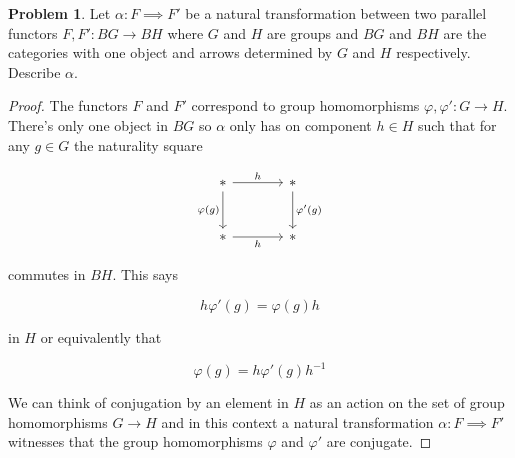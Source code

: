 \documentclass[11pt]{amsart}
\theoremstyle{plain}
\theoremstyle{definition}
\newtheorem{prob}{Problem}
\newcommand{\noi}{{\noindent}}
\begin{document}
\begin{prob}
Let $\alpha : F \implies F'$ be a natural transformation between two parallel functors $F , F' : BG \to BH$ where $G$ and $H$ are groups and $BG$ and $BH$ are the categories with one object and arrows determined by $G$ and $H$ respectively. Describe $\alpha$. 
\end{prob}
\begin{proof}
The functors $F$ and $F'$ correspond to group homomorphisms $\varphi, \varphi' : G \to H$. There's only one object in $BG$ so $\alpha$ only has on component $h \in H$ such that for any $g \in G$ the naturality square 

\[ \begin{tikzcd}[column sep = large, row sep = large]
* \dar["\varphi(g)"'] \rar["h"] & * \dar["\varphi'(g)"] \\
* \rar["h"'] & *
\end{tikzcd}\]

\noi commutes in $BH$. This says 

\[ h \varphi'(g) = \varphi(g) h\]

\noi in $H$ or equivalently that

\[ \varphi(g) = h \varphi'(g) h^{-1} \]

\noi We can think of conjugation by an element in $H$ as an action on the set of group homomorphisms $G \to H$ and in this context a natural transformation $\alpha : F \implies F'$ witnesses that the group homomorphisms $\varphi$ and $\varphi'$ are conjugate. 
\end{proof}
\end{document}

